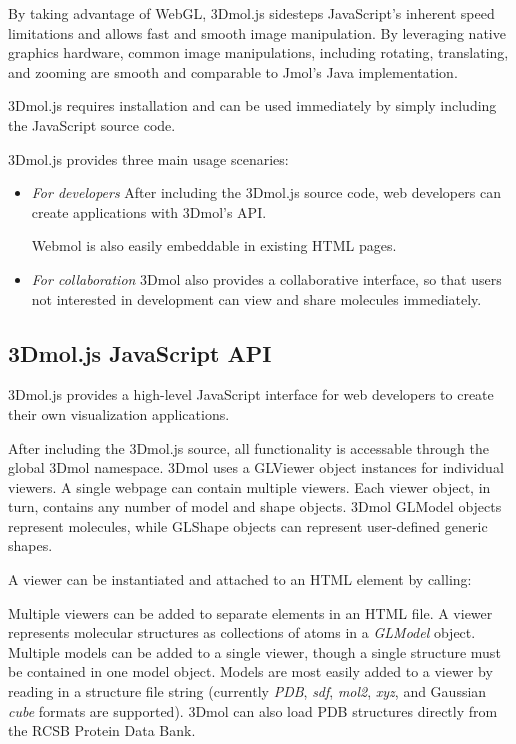 \documentclass[]{bioinfo}
\begin{document}
By taking advantage of WebGL, 3Dmol.js sidesteps JavaScript's inherent speed limitations and allows fast and smooth image manipulation.  By leveraging native graphics hardware, common image manipulations, including rotating, translating, and zooming are smooth and comparable to Jmol's Java implementation.

3Dmol.js requires installation and can be used immediately by simply including the JavaScript source code.

3Dmol.js provides three main usage scenaries:

\begin{itemize}
\item \emph{For developers}
After including the 3Dmol.js source code, web developers can create applications with 3Dmol's API.

Webmol is also easily embeddable in existing HTML pages.

\item \emph{For collaboration}
3Dmol also provides a collaborative interface, so that users not interested in development can view and share molecules immediately.

\end{itemize}

\subsection{3Dmol.js JavaScript API}
3Dmol.js provides a high-level JavaScript interface for web developers to create their own visualization applications. 

After including the 3Dmol.js source, all functionality is accessable through the global 3Dmol namespace. 3Dmol uses a GLViewer object instances for individual viewers.  A single webpage can contain multiple viewers.  Each viewer object, in turn, contains any number of model and shape objects.  3Dmol GLModel objects represent molecules, while GLShape objects can represent user-defined generic shapes.

A viewer can be instantiated and attached to an HTML element by calling:


Multiple viewers can be added to separate elements in an HTML file.  A viewer represents molecular structures as collections of atoms in a \emph{GLModel} object.  Multiple models can be added to a single viewer, though a single structure must be contained in one model object.  Models are most easily added to a viewer by reading in a structure file string (currently \emph{PDB}, \emph{sdf}, \emph{mol2}, \emph{xyz}, and Gaussian \emph{cube} formats are supported).  3Dmol can also load PDB structures directly from the RCSB Protein Data Bank.
\end{document}
